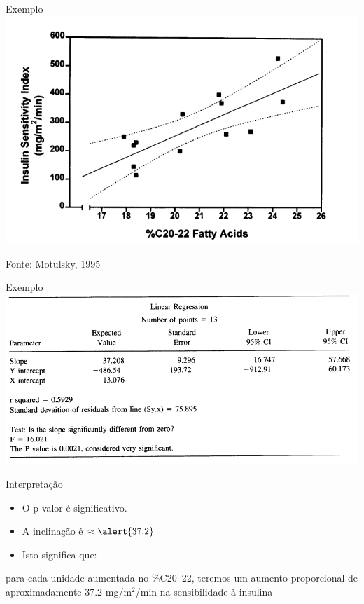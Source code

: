 \documentclass{beamer}
\begin{document}
\begin{frame}{Exemplo}
  \centering
  \includegraphics[width=.9\textwidth]{Cap18-19/regressao1}

  \vfill
  Fonte: Motulsky, 1995
\end{frame}

\begin{frame}{Exemplo}
  \centering
  \includegraphics[width=1.2\textwidth]{Cap18-19/regressao2}
\end{frame}

\begin{frame}{Interpretação}
  \begin{itemize}
  \item O p-valor é significativo.
  \item A inclinação é $\approx \alert{37.2}$
  \item Isto significa que:
  \end{itemize}
  \begin{block}{}
    para cada unidade aumentada no \%C20--22, teremos um aumento proporcional de aproximadamente 37.2 mg/m$^2$/min na sensibilidade à insulina
  \end{block}
\end{frame}
\end{document}
